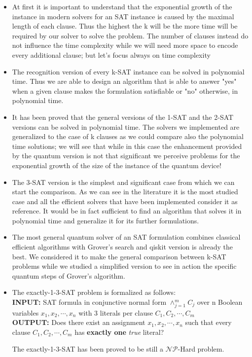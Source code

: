 \documentclass[english]{article}
\begin{document}
			\begin{itemize}
				\item At first it is important to understand that the exponential growth of the instance in modern solvers for an SAT instance is caused by the maximal length of each clause. Thus the highest the k will be the more time will be required by our solver to solve the problem. The number of clauses instead do not influence the time complexity while we will need more space to encode every additional clause; but let's focus always on time complexity
				
				\item The recognition version of every k-SAT instance can be solved in polynomial time. Thus we are able to design an algorithm that is able to answer "yes" when a given clause makes the formulation satisfiable or "no" otherwise, in polynomial time.
				
				\item It has been proved that the general versions of the 1-SAT and the 2-SAT versions can be solved in polynomial time. The solvers we implemented are generalized to the case of k clauses as we could compare also the polynomial time solutions; we will see that while in this case the enhancement provided by the quantum version is not that significant we perceive problems for the exponential growth of the size of the instance of the quantum device!
				
				\item The 3-SAT version is the simplest and significant case from which we can start the comparison. As we can see in the literature it is the most studied case and all the efficient solvers that have been implemented consider it as reference. It would be in fact sufficient to find an algorithm that solves it in polynomial time and generalize it for its further formulations.
				
				\item The most general quantum solver of an SAT formulation combines classical efficient algorithms with Grover's search and qiskit version is already the best. We considered it to make the general comparison between k-SAT problems while we studied a simplified version to see in action the specific quantum steps of Grover's algorithm.
				
				\item The exactly-1-3-SAT problem is formalized as follows: \\
				
				\hspace{0.3cm} \textbf{INPUT:} SAT formula in conjunctive normal form $\land_{j = 1}^{m}C_j$ over n Boolean variables $x_1,x_2,\cdots,x_n$ with 3 literals per clause $C_1,C_2,\cdots,C_m$ \\
				
				\hspace{0.3cm} \textbf{OUTPUT:} Does there exist an assignment $x_1,x_2,\cdots,x_n$ such that every clause $C_1,C_2,\cdots,C_m$ has \textbf{exactly one} \emph{true} literal?
				
				The exactly-1-3-SAT has been proved to be still a $\mathcal{N}\mathcal{P}$-Hard problem.
			\end{itemize}
			
\end{document}
